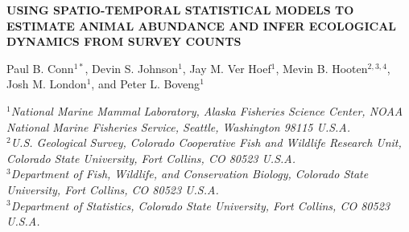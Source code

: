 \documentclass[12pt,fleqn]{article}
\begin{document}
\begin{center} \bf {\large USING SPATIO-TEMPORAL STATISTICAL MODELS TO ESTIMATE ANIMAL ABUNDANCE AND INFER ECOLOGICAL DYNAMICS FROM SURVEY COUNTS}

\vspace{0.7cm}
Paul B. Conn$^{1*}$, Devin S. Johnson$^1$, Jay M. Ver Hoef$^1$, Mevin B. Hooten$^{2,3,4}$, Josh M. London$^1$, and Peter L. Boveng$^1$
\end{center}
\vspace{0.5cm}

\rm
\small

\it $^1$National Marine Mammal Laboratory, Alaska Fisheries Science Center,
NOAA National Marine Fisheries Service,
Seattle, Washington 98115 U.S.A.\\

\it $^2$U.S. Geological Survey, Colorado Cooperative Fish and Wildlife Research Unit, Colorado State University, Fort Collins, CO 80523 U.S.A.\\

\it $^3$Department of Fish, Wildlife, and Conservation Biology, Colorado State University, Fort Collins, CO 80523 U.S.A.\\

\it $^3$Department of Statistics, Colorado State University, Fort Collins, CO 80523 U.S.A.\\
\end{document}

